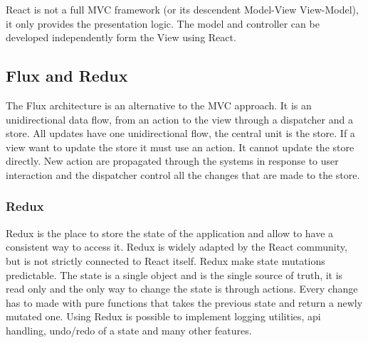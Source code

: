 React is not a full MVC framework (or its descendent Model-View View-Model), it only provides the presentation logic. The model and controller can be developed independently form the View using React.

\subsection*{Flux and Redux}
The Flux architecture is an alternative to the MVC approach. It is an unidirectional data flow, from an action to the view through a dispatcher and a store.
All updates have one unidirectional flow, the central unit is the store. If a view want to update the store it must use an action. It cannot update the store directly.
New action are propagated through the systems in response to user interaction and the dispatcher control all the changes that are made to the store.

\subsubsection*{Redux}
Redux is the place to store the state of the application and allow to have a consistent way to access it. Redux is widely adapted by the React community, but is not strictly connected to React itself. Redux make state mutations predictable.
The state is a single object and is the single source of truth, it is read only and the only way to change the state is through actions. Every change has to made with pure functions that takes the previous state and return a newly mutated one.
Using Redux is possible to implement logging utilities, api handling, undo/redo of a state and many other features.